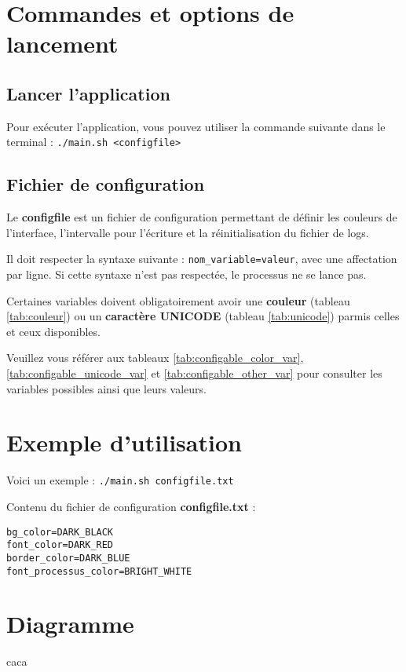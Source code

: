 \documentclass{article}
\begin{document}
\section{Commandes et options de lancement}

\subsection{Lancer l'application}
Pour exécuter l'application, vous pouvez utiliser la commande suivante dans le terminal :  
\texttt{./main.sh <configfile>}

\subsection{Fichier de configuration}
Le \textbf{configfile} est un fichier de configuration permettant de définir les couleurs de l'interface, l'intervalle pour l'écriture et la réinitialisation du fichier de logs.
  
Il doit respecter la syntaxe suivante : \texttt{nom\_variable=valeur}, avec une affectation par ligne. Si cette syntaxe n'est pas respectée, le processus ne se lance pas.
\vspace{1em}

Certaines variables doivent obligatoirement avoir une \textbf{couleur} (tableau \ref{tab:couleur}) ou un \textbf{caractère UNICODE} (tableau \ref{tab:unicode}) parmis celles et ceux disponibles.
  
Veuillez vous référer aux tableaux \ref{tab:configable_color_var}, \ref{tab:configable_unicode_var} et \ref{tab:configable_other_var} pour consulter les variables possibles ainsi que leurs valeurs.

\section{Exemple d'utilisation}
Voici un exemple : \texttt{./main.sh configfile.txt}
  
Contenu du fichier de configuration \textbf{configfile.txt} :
\begin{verbatim}
bg_color=DARK_BLACK
font_color=DARK_RED
border_color=DARK_BLUE
font_processus_color=BRIGHT_WHITE
\end{verbatim}

\section{Diagramme}
caca
\end{document}
